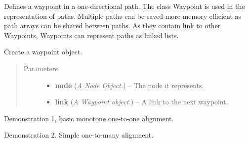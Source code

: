 \documentclass[letterpaper,10pt,english]{sphinxmanual}
\begin{document}

\begin{fulllineitems}
\label{alignments:alignments.Waypoint}
Defines a waypoint in a one-directional path. The class
Waypoint is used in the representation of paths. Multiple
paths can be saved more memory efficient as path arrays
can be shared between paths. As they contain link to other
Waypoints, Waypoints can represent paths as linked lists.

Create a waypoint object.
\begin{quote}\begin{description}
\item[{Parameters}] \leavevmode\begin{itemize}
\item {} 
\textbf{node} (\emph{A Node Object.}) -- The node it represents.

\item {} 
\textbf{link} (\emph{A Waypoint object.}) -- A link to the next waypoint.

\end{itemize}

\end{description}\end{quote}

\end{fulllineitems}


\begin{fulllineitems}
\label{alignments:alignments.demo_basic}
Demonstration 1, basic monotone one-to-one alignment.

\end{fulllineitems}


\begin{fulllineitems}
\label{alignments:alignments.demo_basic2}
Demonstration 2. Simple one-to-many alignment.

\end{fulllineitems}


\begin{fulllineitems}
\label{alignments:alignments.demos}
\end{fulllineitems}
\end{document}

